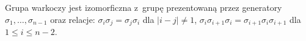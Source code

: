 \begin{comment}
        \strand[semithick] (-3, -2) .. controls (-1, -2) and (-2, 0) .. (0, 0);
        \strand[semithick] (-3, 2) to (0, 2);
        \draw (-6, -3) rectangle (0, 3);
        \draw[semithick, decoration={brace,mirror,raise=3pt},decorate]  (-5.75, -3) -- node[below=6pt] {$\beta_1$} (-0.25, -3);
        \strand[semithick] (+6, 0) .. controls (+4, 0) and (+5, 2) .. (+3, 2);
        \strand[semithick] (+6, 2) .. controls (+4, 2) and (+5, 0) .. (+3, 0);
        \strand[semithick] (+6, -2) to (+3, -2);
        \strand[semithick] (+3, 0) .. controls (+1, 0) and (+2, -2) .. (0, -2);
        \strand[semithick] (+3, -2) .. controls (+1, -2) and (+2, 0) .. (0, 0);
        \strand[semithick] (+3, 2) to (0, 2);
        \draw (+6, -3) rectangle (0, 3);
        \strand[semithick] (6+6, 0) .. controls (6+4, 0) and (6+5, 2) .. (6+3, 2);
        \strand[semithick] (6+6, 2) .. controls (6+4, 2) and (6+5, 0) .. (6+3, 0);
        \strand[semithick] (6+6, -2) to (6+3, -2);
        \strand[semithick] (6+3, 0) .. controls (6+1, 0) and (6+2, -2) .. (6+0, -2);
        \strand[semithick] (6+3, -2) .. controls (6+1, -2) and (6+2, 0) .. (6+0, 0);
        \strand[semithick] (6+3, 2) to (6+0, 2);
        \draw (6+6, -3) rectangle (6+0, 3);
        \draw[semithick, decoration={brace,mirror,raise=3pt},decorate]  (0.25, -3) -- node[below=6pt] {$\beta_2\beta_3$} (11.75, -3);
        \draw[semithick, decoration={brace,raise=3pt},decorate]  (6.25, 3) -- node[above=6pt] {$\beta_3$} (11.75, 3);
        \draw[semithick, decoration={brace,raise=3pt},decorate]  (-5.75, 3) -- node[above=6pt] {$\beta_1\beta_2$} (5.75, 3);
    \end{knot}
    \end{tikzpicture}
\]
\end{comment}

\begin{proposition}
    Grupa warkoczy jest izomorficzna z~grupę prezentowaną przez generatory $\sigma_1, \ldots, \sigma_{n-1}$ oraz relacje:
    $\sigma_i \sigma_j = \sigma_j \sigma_i$ dla $|i - j| \neq 1$,
    $\sigma_i\sigma_{i+1} \sigma_i = \sigma_{i+1} \sigma_i \sigma_{i+1}$ dla $1 \le i \le n-2$.
\end{proposition}

